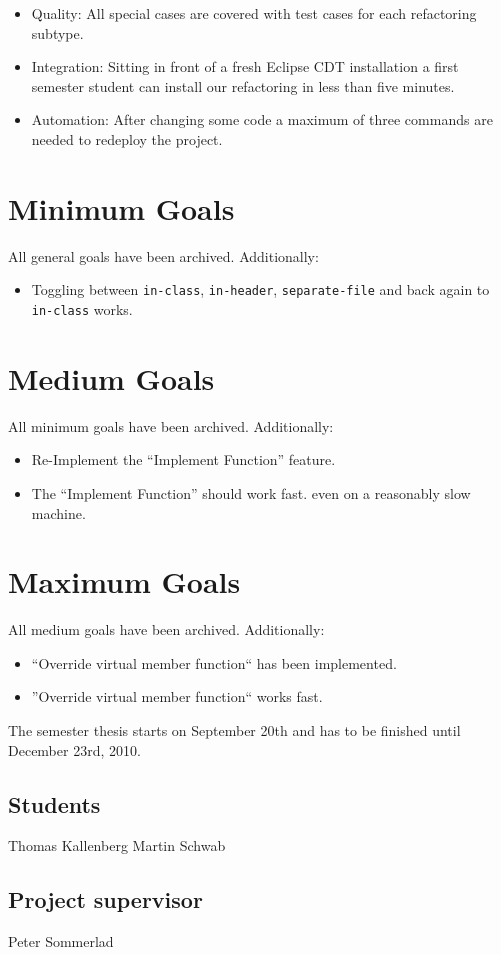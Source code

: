 \documentclass[a4paper,10pt]{scrreprt}
\begin{document}
\begin{itemize}
 \item Quality: All special cases are covered with test cases for each
refactoring subtype.
 \item Integration: Sitting in front of a fresh Eclipse CDT installation a first
semester student can install our refactoring in less than five minutes.
 \item Automation: After changing some code a maximum of three commands are
needed to redeploy the project.
\end{itemize}

\section*{Minimum Goals}

All general goals have been archived. Additionally:
\begin{itemize}
 \item Toggling between \texttt{in-class}, \texttt{in-header},
\texttt{separate-file} and back again to \texttt{in-class} works.
\end{itemize}

\section*{Medium Goals}
All minimum goals have been archived. Additionally:
\begin{itemize}
 \item Re-Implement the ``Implement Function'' feature.
 \item The ``Implement Function'' should work fast. even on a reasonably
slow machine. %
\end{itemize}

\section*{Maximum Goals}
All medium goals have been archived. Additionally:
\begin{itemize}
 \item ``Override virtual member function`` has been implemented.
 \item ''Override virtual member function`` works fast.\newline
\end{itemize}

The semester thesis starts on September 20th and has to be finished until
December 23rd, 2010.

\subsection*{Students}
Thomas Kallenberg \dotfill
Martin Schwab \dotfill
\subsection*{Project supervisor}
Peter Sommerlad \dotfill
\end{document}
